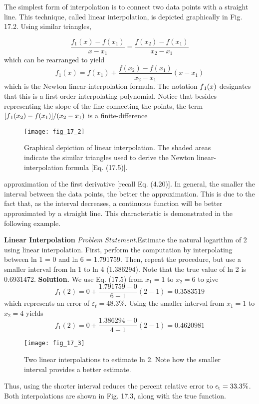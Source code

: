 \documentclass[../main.tex]{subfiles}
\begin{document}
The simplest form of interpolation is to connect two data points with a straight line. This
technique, called linear interpolation, is depicted graphically in Fig. 17.2. Using similar
triangles,

\begin{equation}
    \tag{17.4}
\frac{f_{1}(x)-f\left(x_{1}\right)}{x-x_{1}}=\frac{f\left(x_{2}\right)-f\left(x_{1}\right)}{x_{2}-x_{1}}
\end{equation}
which can be rearranged to yield
\begin{equation}
    \tag{17.5}
f_{1}(x)=f\left(x_{1}\right)+\frac{f\left(x_{2}\right)-f\left(x_{1}\right)}{x_{2}-x_{1}}\left(x-x_{1}\right)
\end{equation}
which is the Newton linear-interpolation formula. The notation $f\textsubscript{1}(x)$ designates that this
is a first-order interpolating polynomial. Notice that besides representing the slope of the
line connecting the points, the term $[ f\textsubscript{1} (x\textsubscript{2}) - f (x\textsubscript{1})]/(x\textsubscript{2} - x\textsubscript{1})$ is a finite-difference

\begin{figure}[H]
    \centering
    \texttt{[image: fig\_17\_2]}
   \caption{\textsf{Graphical depiction of linear interpolation. The shaded areas indicate the similar triangles used
   to derive the Newton linear-interpolation formula [Eq. (17.5)].}}\label{fig:fig_17_2}
\end{figure}

approximation of the first derivative [recall Eq. (4.20)]. In general, the smaller the interval
between the data points, the better the approximation. This is due to the fact that, as the
interval decreases, a continuous function will be better approximated by a straight line.
This characteristic is demonstrated in the following example.
\begin{exmp} \textbf{Linear Interpolation}
    \noindent\textit{Problem Statement.}Estimate the natural logarithm of 2 using linear interpolation. First,
    perform the computation by interpolating between ln 1 = 0 and ln 6 = 1.791759. Then,
    repeat the procedure, but use a smaller interval from ln 1 to ln 4 (1.386294). Note that the
    true value of ln 2 is 0.6931472.
    \noindent \textbf{Solution.} We use Eq. (17.5) from $x_{1}=1$ to $x_{2}=6$ to give
    $$
    f_{1}(2)=0+\frac{1.791759-0}{6-1}(2-1)=0.3583519
    $$
    which represents an error of $\varepsilon_{t}=48.3 \%$. Using the smaller interval from $x_{1}=1$ to $x_{2}=4$ yields
    $$
    f_{1}(2)=0+\frac{1.386294-0}{4-1}(2-1)=0.4620981
    $$

    \begin{figure}[H]
        \centering
        \texttt{[image: fig\_17\_3]}
       \caption{\textsf{Two linear interpolations to estimate ln 2. Note how the smaller interval provides a better
       estimate.}}\label{fig:fig_17_3}
    \end{figure}
    Thus, using the shorter interval reduces the percent relative error to $\epsilon\textsubscript{t} = 33.3\%{}$. Both
    interpolations are shown in Fig. 17.3, along with the true function.

\end{exmp}
\end{document}
